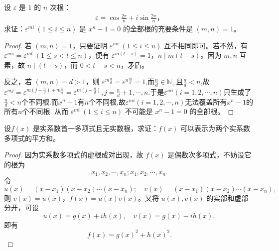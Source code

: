 \documentclass[../../main.tex]{subfiles}
\begin{document}
\begin{example}
设 $\varepsilon$ 是 1 的 $n$ 次根：
\begin{align*}
\varepsilon = \cos \frac{2\pi}{n} + i \sin \frac{2\pi}{n}，
\end{align*}
求证：$\varepsilon^{mi} \ (1 \leqslant  i \leqslant  n)$ 是 $x^n - 1 = 0$ 的全部根的充要条件是 $(m, n) = 1$。
\end{example}
\begin{proof}
若 $(m, n) = 1$，只要证明 $\varepsilon^{mi} \ (1 \leqslant  i \leqslant  n)$ 互不相同即可。若不然，有 $\varepsilon^{ms} = \varepsilon^{mt} \ (1 \leqslant  s < t \leqslant  n)$，便有 $\varepsilon^{m(t-s)} = 1$，$n \mid m(t-s)$。因为 $m, n$ 互素，故 $n \mid (t-s)$，而 $0 < t-s < n$，矛盾。

反之，若 $(m, n) = d > 1$，则 $\varepsilon^{m \frac{n}{d}} = \varepsilon^{n \frac{m}{d}} = 1$,而$\frac{n}{d}\in \mathbb{N}_+$且$\frac{n}{d}<n$,故$\varepsilon ^{mj}=\varepsilon ^{m\left( j-\frac{n}{d} \right) +m\frac{n}{d}}=\varepsilon ^{m\left( j-\frac{n}{d} \right)},j=\frac{n}{d}+1,\cdots ,n.$于是$\varepsilon ^{mi}\left( i=1,2,\cdots ,n \right) $只生成了$\frac{n}{d}<n$个不同根.而$x^n-1$有$n$个不同根,故$\varepsilon ^{mi}\left( i=1,2,\cdots ,n \right)$无法覆盖所有$x^n-1$的所有$n$个不同根.
从而 $\varepsilon^{mi} \ (1 \leqslant  i \leqslant  n)$ 不可能是 $x^n - 1 = 0$ 的全部根。

\end{proof}

\begin{proposition}
设\( f(x) \) 是实系数首一多项式且无实数根，求证：\( f(x) \) 可以表示为两个实系数多项式的平方和。
\end{proposition}
\begin{proof}
因为实系数多项式的虚根成对出现，故 \( f(x) \) 是偶数次多项式，不妨设它的根为
\[
x_1, x_2, \cdots, x_n; \overline{x_1}, \overline{x_2}, \cdots, \overline{x_n}.
\]
令
\[
u(x) = (x - x_1)(x - x_2) \cdots (x - x_n); \quad v(x) = (x - \overline{x_1})(x - \overline{x_2}) \cdots (x - \overline{x_n}),
\]
则 \( v(x) = \overline{u(x)} \)，\( f(x) = u(x)v(x) \)。又将 \( u(x), v(x) \) 的实部和虚部分开，可设
\[
u(x) = g(x) + ih(x), \quad v(x) = g(x) - ih(x),
\]
即有
\[
f(x) = g(x)^2 + h(x)^2.
\]

\end{proof}
\end{document}
